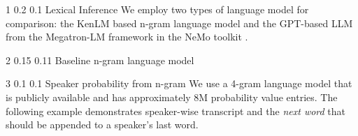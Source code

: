 \documentclass{article}
\makeatletter
\renewcommand{\section}{\@startsection
  {section}%
  {1}%
  {}%
  {0.2\baselineskip}%
  {0.1\baselineskip}%
  {}
}%
\renewcommand{\subsection}{\@startsection
  {subsection}%
  {2}%
  {}%
  {0.15\baselineskip}%
  {0.11\baselineskip}%
  {}}%
\renewcommand{\subsubsection}{\@startsection
  {subsubsection}%
  {3}%
  {}%
  {0.1\baselineskip}%
  {0.1\baselineskip}%
  {}}%
\makeatother
\begin{document}
\section{Lexical Inference}
\label{sec:lexical_infer}
We employ two types of language model for comparison: the KenLM\cite{heafield2011kenlm} based n-gram language model and  the GPT-based LLM from the Megatron-LM framework in the NeMo toolkit \cite{shoeybi2019megatron, kuchaiev2019nemo}. 
\subsection{Baseline n-gram language model}
\subsubsection{Speaker probability from n-gram}
We use a 4-gram language model \cite{panayotov2015librispeech} that is publicly available and has approximately 8M probability value entries. The following example demonstrates speaker-wise transcript and the \textit{next word} that should be appended to a speaker's last word.
\end{document}
